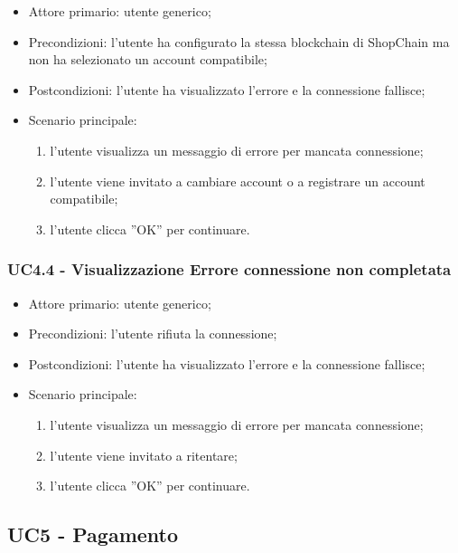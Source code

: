 \begin{itemize}
    \item Attore primario: utente generico;
    \item Precondizioni: l'utente ha configurato la stessa blockchain di ShopChain ma non ha selezionato un account compatibile;
    \item Postcondizioni: l'utente ha visualizzato l'errore e la connessione fallisce;
    \item Scenario principale:
    \begin{enumerate}
        \item l'utente visualizza un messaggio di errore per mancata connessione;
        \item l'utente viene invitato a cambiare account o a registrare un account compatibile;
        \item l'utente clicca ”OK” per continuare.
    \end{enumerate}
\end{itemize}

\subsubsection{UC4.4 - Visualizzazione Errore connessione non completata}

\begin{itemize}
    \item Attore primario: utente generico;
    \item Precondizioni: l'utente rifiuta la connessione;
    \item Postcondizioni: l'utente ha visualizzato l'errore e la connessione fallisce;
    \item Scenario principale:
    \begin{enumerate}
        \item l'utente visualizza un messaggio di errore per mancata connessione;
        \item l'utente viene invitato a ritentare;
        \item l'utente clicca ”OK” per continuare.
    \end{enumerate}
\end{itemize}

\subsection{UC5 - Pagamento}

